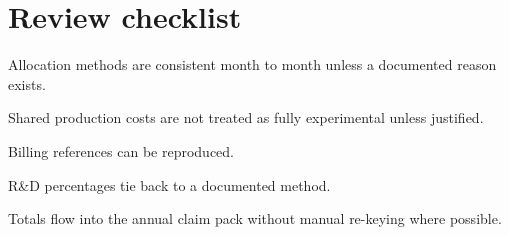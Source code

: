 \documentclass[11pt]{article}
\begin{document}
\section{Review checklist}
\begin{RDChecklist}
\item Allocation methods are consistent month to month unless a documented reason exists.
\item Shared production costs are not treated as fully experimental unless justified.
\item Billing references can be reproduced.
\item R\&D percentages tie back to a documented method.
\item Totals flow into the annual claim pack without manual re-keying where possible.
\end{RDChecklist}

\RDEndMatter
\end{document}
